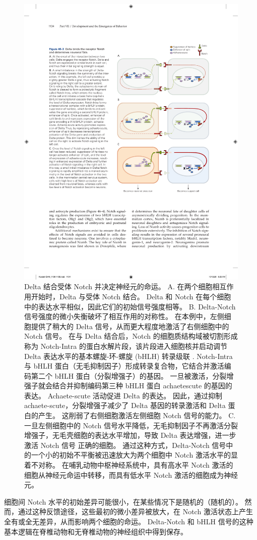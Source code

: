 \begin{figure}[htbp]
	\centering
	\includegraphics[width=0.65\linewidth]{chap46/fig_46_3}
	\caption{Delta 结合受体 Notch 并决定神经元的命运。 A. 在两个细胞相互作用开始时，Delta 与受体 Notch 结合。 Delta 和 Notch 在每个细胞中的表达水平相似，因此它们的初始信号强度相等。 B. Delta-Notch 信号强度的微小失衡破坏了相互作用的对称性。 在本例中，左侧细胞提供了稍大的 Delta 信号，从而更大程度地激活了右侧细胞中的 Notch 信号。 在与 Delta 结合后，Notch 的细胞质结构域被切割形成称为 Notch-Intra 的蛋白水解片段，该片段进入细胞核并启动调节 Delta 表达水平的基本螺旋-环-螺旋 (bHLH) 转录级联 . Notch-Intra 与 bHLH 蛋白（无毛抑制因子）形成转录复合物，它结合并激活编码第二个 bHLH 蛋白（分裂增强子）的基因。 一旦被激活，分裂增强子就会结合并抑制编码第三种 bHLH 蛋白 achaetescute 的基因的表达。 Achaete-scute 活动促进 Delta 的表达。 因此，通过抑制 achaete-scute，分裂增强子减少了 Delta 基因的转录激活和 Delta 蛋白的产生。 这削弱了右侧细胞激活左侧细胞 Notch 信号的能力。 C. 一旦左侧细胞中的 Notch 信号水平降低，无毛抑制因子不再激活分裂增强子，无毛壳细胞的表达水平增加，导致 Delta 表达增强，进一步激活 Notch 信号 正确的细胞。 通过这种方式，Delta-Notch 信号中的一个小的初始不平衡被迅速放大为两个细胞中 Notch 激活水平的显着不对称。 在哺乳动物中枢神经系统中，具有高水平 Notch 激活的细胞从神经元命运中转移，而具有低水平 Notch 激活的细胞成为神经元。}
	\label{fig:46_3}
\end{figure}

细胞间 Notch 水平的初始差异可能很小，在某些情况下是随机的（随机的）。 然而，通过这种反馈途径，这些最初的微小差异被放大，在 Notch 激活状态上产生全有或全无差异，从而影响两个细胞的命运。 Delta-Notch 和 bHLH 信号的这种基本逻辑在脊椎动物和无脊椎动物的神经组织中得到保存。


